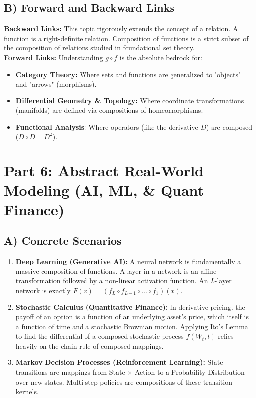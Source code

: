 \documentclass[11pt, a4paper]{article}
\theoremstyle{definition}
\theoremstyle{remark}
\begin{document}
\subsection{B) Forward and Backward Links}
\textbf{Backward Links:} This topic rigorously extends the concept of a relation. A function is a right-definite relation. Composition of functions is a strict subset of the composition of relations studied in foundational set theory. \\
\textbf{Forward Links:} Understanding $g \circ f$ is the absolute bedrock for:
\begin{itemize}
    \item \textbf{Category Theory:} Where sets and functions are generalized to "objects" and "arrows" (morphisms).
    \item \textbf{Differential Geometry \& Topology:} Where coordinate transformations (manifolds) are defined via compositions of homeomorphisms.
    \item \textbf{Functional Analysis:} Where operators (like the derivative $D$) are composed ($D \circ D = D^2$).
\end{itemize}

\section{Part 6: Abstract Real-World Modeling (AI, ML, \& Quant Finance)}

\subsection{A) Concrete Scenarios}
\begin{enumerate}
    \item \textbf{Deep Learning (Generative AI):} A neural network is fundamentally a massive composition of functions. A layer in a network is an affine transformation followed by a non-linear activation function. An $L$-layer network is exactly $F(x) = (f_L \circ f_{L-1} \circ \dots \circ f_1)(x)$.
    \item \textbf{Stochastic Calculus (Quantitative Finance):} In derivative pricing, the payoff of an option is a function of an underlying asset's price, which itself is a function of time and a stochastic Brownian motion. Applying Ito's Lemma to find the differential of a composed stochastic process $f(W_t, t)$ relies heavily on the chain rule of composed mappings.
    \item \textbf{Markov Decision Processes (Reinforcement Learning):} State transitions are mappings from State $\times$ Action to a Probability Distribution over new states. Multi-step policies are compositions of these transition kernels.
\end{enumerate}
\end{document}
